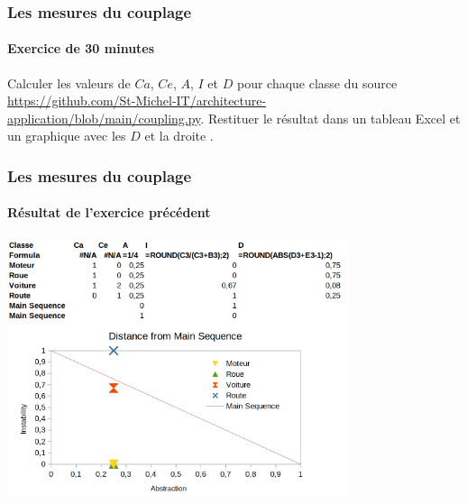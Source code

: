 \documentclass{beamer}
\begin{document}
    \begin{frame}
        \transdissolve
        \frametitle{Les mesures du couplage}
        \framesubtitle{Exercice \execcounterdispinc{} de 30 minutes}
        Calculer les valeurs de $Ca$, $Ce$, $A$, $I$ et $D$ pour chaque classe du source \url{https://github.com/St-Michel-IT/architecture-application/blob/main/coupling.py}.
        \bigbreak
        Restituer le résultat dans un tableau Excel et un graphique avec les $D$ et la droite .
    \end{frame}

    \begin{frame}
        \transdissolve
        \frametitle{Les mesures du couplage}
        \framesubtitle{Résultat de l'exercice précédent}
        \centering
        \includegraphics[width=10cm]{image/exercice-metrics-1}
    \end{frame}
\end{document}
